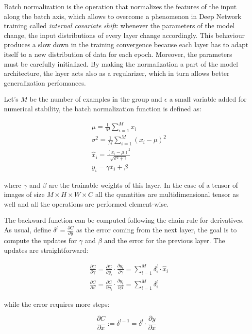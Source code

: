 \documentclass[12pt,a4paper]{report}
\begin{document}
Batch normalization is the operation that normalizes the features of the input along the batch axis, which allows to overcome a phenomenon in Deep Network training called {\it internal covariate shift}: whenever the parameters of the model change, the input distributions of every layer change accordingly.
This behaviour produces a slow down in the training convergence because each layer has to adapt itself to a new distribution of data for each epoch. Moreover, the parameters must be carefully initialized. 
By making the normalization a part of the model architecture, the layer acts also as a regularizer, which in turn allows better generalization perfomances.  

Let's $M$ be the number of examples in the group and $\epsilon$ a small variable added for numerical stability, the batch normalization function is defined as: 

\begin{align}
  &\mu = \frac{1}{M} \sum_{i=1}^{M} x_i \\
  &\sigma^2 = \frac{1}{M} \sum_{i=1}^{M} (x_i - \mu)^2 \\
  &\hat x_i = \frac{(x_i - \mu)^2}{\sqrt{\sigma^2 + \epsilon}} \\
  &y_i = \gamma \bar x_i + \beta
\end{align}

where $\gamma$ and $\beta$ are the trainable weights of this layer. In the case of a tensor of images of size $M \times H \times W \times C$ all the quantities are multidimensional tensor as well and all the operations are performed element-wise.

The backward function can be computed following the chain rule for derivatives. As usual, define $\delta^l = \frac{\partial C}{\partial y}$ as the error coming from the next layer, the goal is to compute the updates for $\gamma$ and $\beta$ and the error for the previous layer. 
The updates are straightforward: 

\begin{align}
 &\frac{\partial C}{\partial \gamma} = \frac{\partial C}{\partial y_i} \cdot \frac{\partial y_i}{\partial \gamma} = \sum_{i=1}^{M} \delta_i^l \cdot \hat x_i \\
 &\frac{\partial C}{\partial \beta} = \frac{\partial C}{\partial y_i} \cdot \frac{\partial y_i}{\partial \beta} = \sum_{i=1}^M \delta_i^l 
\end{align}

while the error requires more steps:

\begin{equation}
 \frac{\partial C}{\partial x} := \delta^{l-1} = \delta^l \cdot \frac{\partial y}{\partial  x}
\end{equation}
\end{document}
